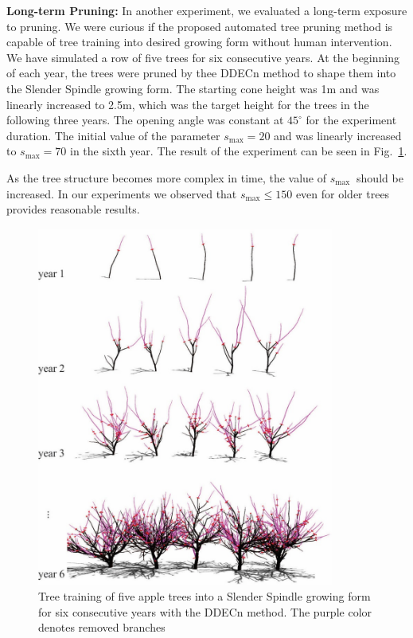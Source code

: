 \noindent\textbf{Long-term Pruning:} In another experiment, we evaluated a
long-term exposure to pruning. We were curious if the proposed automated tree pruning method is 
capable of tree
training into desired growing form without human intervention. We have
simulated a row of five trees for six consecutive years. At the
beginning of each year, the trees were pruned by thee DDECn method to shape
them into the Slender Spindle growing form. The starting cone height was
1m and was linearly increased to 2.5m, which was the target height for
the trees in the following three years. The opening angle was constant
at $45^\circ$ for the experiment duration. The initial value of the parameter
\(s_{\mathrm{\max}}=20\) and was linearly increased to \(s_{\mathrm{\max}}=70\) in
the sixth year. The result of the experiment can be seen in Fig.~\ref{fig:my_figure7}.

As the tree structure becomes more complex in time, the
value of \(s_{\mathrm{\max}}\ \) should be increased. In our experiments
we observed that \(s_{\mathrm{\max}}\leq{150}\) even
for older trees provides reasonable results.
\begin{figure}[hbt]
    \centering
    \includegraphics[width=3.84333in,height=4.66333in]{figs/image7.jpeg}
    \caption{Tree training of five apple trees into a Slender
Spindle growing form for six consecutive years with the DDECn method.
The purple color denotes removed branches}
    \label{fig:my_figure7}
\end{figure}


